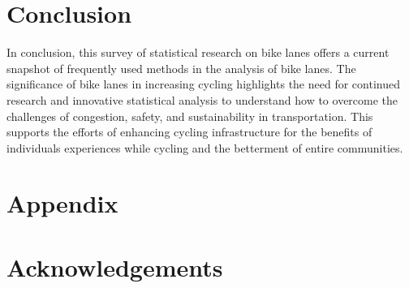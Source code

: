 \documentclass[12pt, letterpaper]{article}
\begin{document}
\section{Conclusion}
\label{sec:conc}

In conclusion, this survey of statistical research on bike lanes offers a current snapshot of frequently used methods in the analysis of bike lanes. The significance of bike lanes in increasing cycling highlights the need for continued research and innovative statistical analysis to understand how to overcome the challenges of congestion, safety, and sustainability in transportation. This supports the efforts of enhancing cycling infrastructure for the benefits of individuals experiences while cycling and the betterment of entire communities. 

\section{Appendix}
\label{sec:appendix}


\section{Acknowledgements}
\label{sec:acknow}



\end{document}
